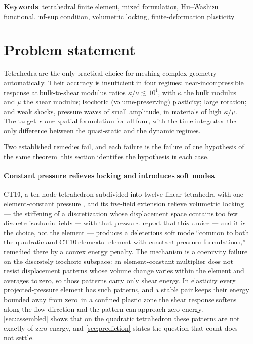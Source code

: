 \documentclass{article}
\theoremstyle{definition}
\theoremstyle{plain}
\providecommand{\keywords}[1]{\textbf{Keywords:} #1}
\begin{document}
\keywords{tetrahedral finite element, mixed formulation, Hu--Washizu functional, inf-sup condition, volumetric locking, finite-deformation plasticity}

\section{Problem statement}
\label{sec:problem}

Tetrahedra are the only practical choice for meshing complex geometry
automatically. Their accuracy is insufficient in four regimes: near-incompressible
response at bulk-to-shear modulus ratios $\kappa/\mu \lesssim 10^4$, with
$\kappa$ the bulk modulus and $\mu$ the shear modulus; isochoric
(volume-preserving) plasticity; large rotation; and weak shocks, pressure
waves of small amplitude, in materials of high $\kappa/\mu$. The target is
one spatial formulation for all four, with the time integrator the only
difference between the quasi-static and the dynamic regimes.

Two established remedies fail, and each failure is the failure of one
hypothesis of the same theorem; this section identifies the hypothesis in
each case.

\paragraph{Constant pressure relieves locking and introduces soft modes.}
CT10, a ten-node tetrahedron subdivided into twelve
linear tetrahedra with one element-constant pressure
\cite{Thoutireddy.etal:2002, Ostien.etal:2016}, and its five-field extension
\cite{Foulk.etal:2021} relieve volumetric locking --- the stiffening of a
discretization whose displacement space contains too few discrete isochoric
fields --- with that pressure. \textcite{Foulk.etal:2021} report that this
choice --- and it is the choice, not the element --- produces a deleterious
soft mode ``common to both the quadratic and CT10 elementsl element with
constant pressure formulations,'' remedied there by a convex energy penalty.
The mechanism is a coercivity failure on the discretely isochoric subspace: an
element-constant multiplier does not resist displacement patterns whose volume
change varies within the element and averages to zero, so those patterns carry
only shear energy. In elasticity every projected-pressure element has such
patterns, and a stable pair keeps their energy bounded away from zero; in a
confined plastic zone the shear response softens along the flow direction and
the pattern can approach zero energy. \cref{sec:assembled} shows that on the
quadratic tetrahedron these patterns are not exactly of zero energy, and
\cref{sec:prediction} states the question that count does not settle.
\end{document}
